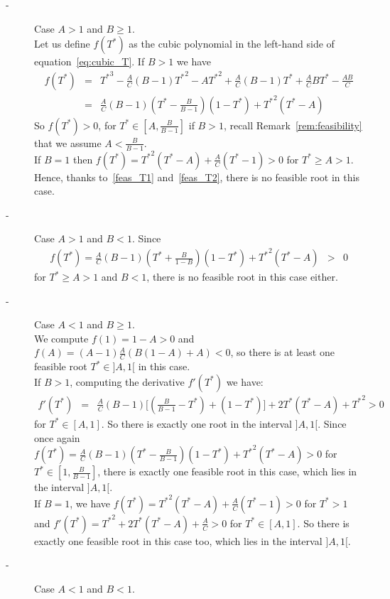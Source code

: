 \documentclass[a4paper, 12pt]{article}
\begin{document}
\begin{description}
\item[-] Case $A > 1$ and $B \geq 1$.\\ 
Let us define $f(T^*)$ as the cubic polynomial in the left-hand side of equation~\eqref{eq:cubic_T}. 
If $B>1$ we have
\begin{eqnarray*}
f(T^*)&=&{T^*}^3-\frac{A}{C}(B-1){T^*}^2-A{T^*}^2+\frac{A}{C}(B-1)T^*+\frac{A}{C}BT^*-\frac{AB}{C}\\\nonumber
&=&\frac{A}{C}(B-1)(T^*-\frac{B}{B-1})(1-T^*)+{T^*}^2(T^*-A)
\end{eqnarray*} 
So $f(T^*)>0$, for $T^* \in [A, \frac{B}{B-1}]$  if $B>1$, recall Remark~\ref{rem:feasibility} that we assume $A < \frac{B}{B-1}$.\\
If $B=1$ then $f(T^*)={T^*}^2(T^*-A)+\frac{A}{C}(T^*-1)>0$ for $T^*\geq A > 1$.\\
Hence, thanks to~\eqref{feas_T1} and~\eqref{feas_T2}, there is no feasible root in this case.
\item[-] Case $A > 1$ and $B < 1$.
Since \begin{eqnarray*}
f(T^*)=\frac{A}{C}(B-1)(T^*+\frac{B}{1-B})(1-T^*)+{T^*}^2(T^*-A)&>&0
\end{eqnarray*}
for $T^* \geq A > 1$ and $B<1$, there is no feasible root in this case either. 
\item[-] Case $A < 1$ and $B  \geq 1$.\\
We compute $f(1)=1-A>0$ and $f(A)=(A-1)\frac{A}{C}(B(1-A)+A)<0$, 
so there is at least one feasible root  $T^* \in ]A,1[$ in this case.\\
If $B>1$, computing the derivative $f'(T^*)$ we have:
\begin{eqnarray*}
f'(T^*) &=& \frac{A}{C}(B-1)\big[(\frac{B}{B-1}-T^*)+(1-T^*)\big]+2{T^*}(T^*-A)+{T^*}^2 >0
\end{eqnarray*}
for $T^* \in [A,1]$. So there is exactly one root in the interval $]A,1[$.
Since once again $f(T^*)=\frac{A}{C}(B-1)(T^*-\frac{B}{B-1})(1-T^*)+{T^*}^2(T^*-A) >0$  for $T^* \in [1, \frac{B}{B-1}]$, 
there is exactly one feasible root in this case, which lies in the interval $]A, 1[$.\\
If $B=1$, we have $f(T^*)={T^*}^2(T^*-A)+\frac{A}{C}(T^*-1)>0$ for $T^*>1$ and $f'(T^*)={T^*}^2+2{T^*}({T^*}-A)+\frac{A}{C}>0$ for $T^* \in [A,1]$. 
So there is exactly one feasible root in this case too, which lies in the interval $]A,1[$.
\item[-] Case $A < 1$ and $B < 1$.\\

\end{description}
\end{document}
